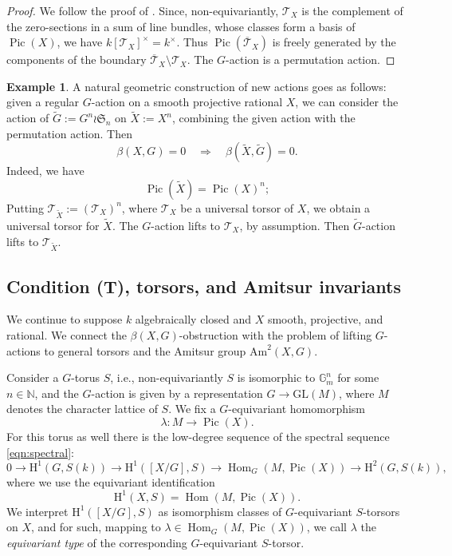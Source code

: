 \documentclass[12pt,reqno]{amsart}
\theoremstyle{plain}
\theoremstyle{remark}
\theoremstyle{definition}
\newtheorem{exam}[prop]{Example}
\numberwithin{equation}{section}
\newcommand{\G}{{\mathbb G}}
\newcommand{\cT}{{\mathcal T}}
\newcommand{\rH}{{\mathrm H}}
\newcommand{\GL}{{\mathrm{GL}}}
\newcommand{\bN}{{\mathbb N}}
\newcommand{\Am}{\mathrm{Am}}
\newcommand{\fS}{{\mathfrak S}}
\DeclareMathOperator{\Pic}{Pic}
\DeclareMathOperator{\Hom}{Hom}
\begin{document}
\begin{proof}
We follow the proof of \cite[Thm.\ 2.1.2]{CTSansucDuke}.
Since, non-equivariantly, $\cT_X$ is the
complement of the zero-sections in a sum of line bundles,
whose classes form a basis of $\Pic(X)$,
we have $k[\cT_X]^\times =k^\times$.
Thus $\Pic(\overline{\cT}_X)$ is freely generated by the components of the boundary $\overline{\cT}_X\setminus \cT_X$.
The $G$-action is a permutation action.
\end{proof}


\begin{exam}
A natural geometric construction of new actions goes as follows: given a regular $G$-action on a smooth projective rational $X$,  we can consider the action of $\widetilde{G}:=G^n\wr \fS_n$  on $\widetilde{X}:=X^n$, combining the given action with the permutation action. Then 
$$
\beta(X,G)=0 \quad \Rightarrow \quad  \beta(\widetilde{X}, \widetilde{G})=0. 
$$
Indeed, we have 
$$
\Pic(\widetilde{X})=\Pic(X)^n; 
$$
Putting $\cT_{\widetilde{X}}:=(\cT_X)^n$, 
where $\cT_X$ be a universal torsor of $X$,
we obtain a universal torsor for $\widetilde{X}$. 
The $G$-action lifts to $\cT_X$, by assumption. Then 
$\widetilde{G}$-action lifts to $\cT_{\widetilde{X}}$. 
\end{exam}





\subsection*{Condition {\bf (T)}, torsors, and Amitsur invariants}
We continue to suppose $k$ algebraically closed and $X$ smooth, projective, and rational.
We connect the $\beta(X,G)$-obstruction with the problem of lifting $G$-actions to general torsors and the Amitsur group $\Am^2(X,G)$.

Consider a $G$-torus $S$, i.e., non-equivariantly $S$ is isomorphic to $\G_m^n$ for some $n\in \bN$, and the $G$-action is given by a representation $G\to \GL(M)$, where $M$ denotes the character lattice of $S$.
We fix a $G$-equivariant homomorphism
\[ \lambda\colon M\to \Pic(X). \]
For this torus as well there is the low-degree sequence of the spectral sequence \eqref{eqn:spectral}:
\[
0\to  \rH^1(G,S(k))\to \rH^1([X/G],S)\to 
\Hom_G(M,\Pic(X)) \to  \rH^2(G,S(k)),
\]
where we use the equivariant identification
$$
\rH^1(X,S)=\Hom(M,\Pic(X)).
$$
We interpret $\rH^1([X/G],S)$ as isomorphism classes of $G$-equivariant $S$-torsors on $X$, and for such, mapping to $\lambda\in \Hom_G(M,\Pic(X))$, we call $\lambda$ the \emph{equivariant type} of the corresponding $G$-equivariant $S$-torsor.
\end{document}
